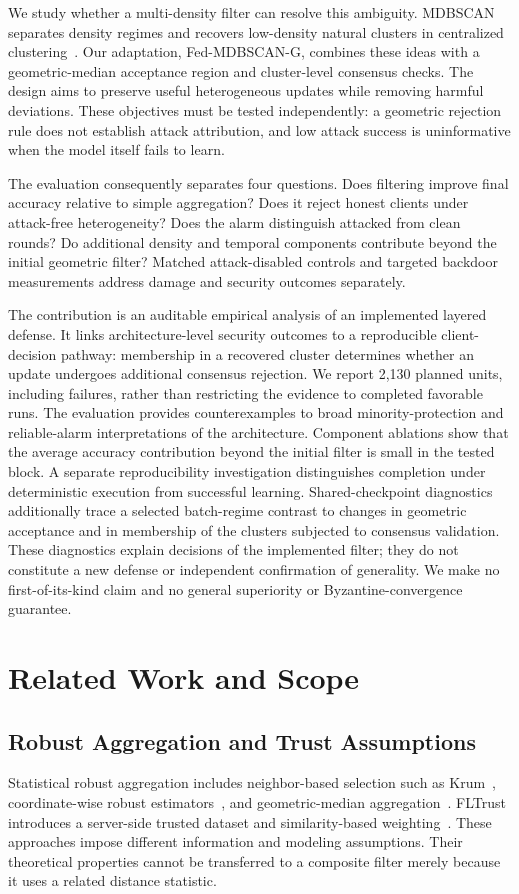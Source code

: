 \documentclass[journal]{IEEEtran}
\newcommand{\method}{Fed-MDBSCAN-G}
\begin{document}
We study whether a multi-density filter can resolve this ambiguity. MDBSCAN separates density regimes and recovers low-density natural clusters in centralized clustering~\cite{qian2024mdbscan}. Our adaptation, \method{}, combines these ideas with a geometric-median acceptance region and cluster-level consensus checks. The design aims to preserve useful heterogeneous updates while removing harmful deviations. These objectives must be tested independently: a geometric rejection rule does not establish attack attribution, and low attack success is uninformative when the model itself fails to learn.

The evaluation consequently separates four questions. Does filtering improve final accuracy relative to simple aggregation? Does it reject honest clients under attack-free heterogeneity? Does the alarm distinguish attacked from clean rounds? Do additional density and temporal components contribute beyond the initial geometric filter? Matched attack-disabled controls and targeted backdoor measurements address damage and security outcomes separately.

The contribution is an auditable empirical analysis of an implemented layered defense. It links architecture-level security outcomes to a reproducible client-decision pathway: membership in a recovered cluster determines whether an update undergoes additional consensus rejection. We report 2,130 planned units, including failures, rather than restricting the evidence to completed favorable runs. The evaluation provides counterexamples to broad minority-protection and reliable-alarm interpretations of the architecture. Component ablations show that the average accuracy contribution beyond the initial filter is small in the tested block. A separate reproducibility investigation distinguishes completion under deterministic execution from successful learning. Shared-checkpoint diagnostics additionally trace a selected batch-regime contrast to changes in geometric acceptance and in membership of the clusters subjected to consensus validation. These diagnostics explain decisions of the implemented filter; they do not constitute a new defense or independent confirmation of generality. We make no first-of-its-kind claim and no general superiority or Byzantine-convergence guarantee.

\section{Related Work and Scope}
\subsection{Robust Aggregation and Trust Assumptions}
Statistical robust aggregation includes neighbor-based selection such as Krum~\cite{blanchard2017}, coordinate-wise robust estimators~\cite{yin2018}, and geometric-median aggregation~\cite{pillutla2022rfa}. FLTrust introduces a server-side trusted dataset and similarity-based weighting~\cite{cao2021fltrust}. These approaches impose different information and modeling assumptions. Their theoretical properties cannot be transferred to a composite filter merely because it uses a related distance statistic.
\end{document}
